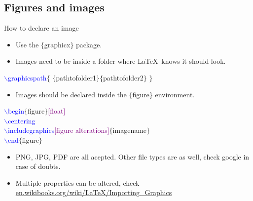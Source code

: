 \documentclass[usenames,dvipsnames,aspectratio=169]{beamer}
\newcommand{\aitem}{\item[$\cdot$]}
\begin{document}
\subsection{Figures and images}
\begin{frame}[t]{How to declare an image}
\begin{itemize}
\aitem Use the \textcolor{PineGreen}{$\{$graphicx$\}$} package.
\aitem Images need to be inside a folder where \LaTeX~knows it should look.
\end{itemize}
\textcolor{blue}{$\backslash$graphicspath}\textcolor{PineGreen}{$\{$ $\{$pathtofolder1$\}\{$pathtofolder2$\}$ $\}$}
\begin{itemize}
\aitem Images should be declared inside the \textcolor{PineGreen}{$\{$figure$\}$} environment.
\end{itemize}
\textcolor{blue}{$\backslash$begin}\textcolor{PineGreen}{$\{$figure$\}$}\textcolor{purple}{[float]}\\
\textcolor{blue}{$\backslash$centering}\\
\textcolor{blue}{$\backslash$includegraphics}\textcolor{purple}{[figure alterations]}\textcolor{PineGreen}{$\{$imagename$\}$}\\
\textcolor{blue}{$\backslash$end}\textcolor{PineGreen}{$\{$figure$\}$}
\begin{itemize}
\aitem PNG, JPG, PDF are all acepted. Other file types are as well, check google in case of doubts.
\aitem Multiple properties can be altered, check \textcolor{blue}{\url{en.wikibooks.org/wiki/LaTeX/Importing\_Graphics}}
\end{itemize}
\end{frame}

\end{document}
